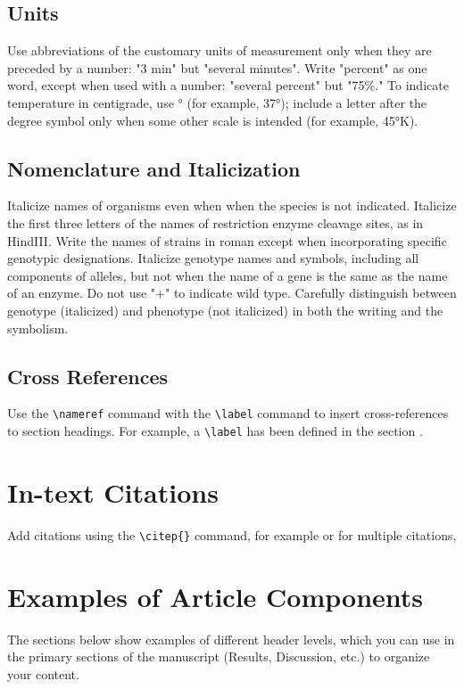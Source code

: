 \documentclass[9pt,twocolumn,twoside]{gsajnl}
\begin{document}
\subsection{Units} Use abbreviations of the customary units of measurement only when they are preceded by a number: "3 min" but "several minutes". Write "percent" as one word, except when used with a number: "several percent" but "75\%." To indicate temperature in centigrade, use ° (for example, 37°); include a letter after the degree symbol only when some other scale is intended (for example, 45°K).

\subsection{Nomenclature and Italicization} Italicize names of organisms even when  when the species is not indicated.  Italicize the first three letters of the names of restriction enzyme cleavage sites, as in HindIII. Write the names of strains in roman except when incorporating specific genotypic designations. Italicize genotype names and symbols, including all components of alleles, but not when the name of a gene is the same as the name of an enzyme. Do not use "+" to indicate wild type. Carefully distinguish between genotype (italicized) and phenotype (not italicized) in both the writing and the symbolism.

\subsection{Cross References}
Use the \verb|\nameref| command with the \verb|\label| command to insert cross-references to section headings. For example, a \verb|\label| has been defined in the section .

\section{In-text Citations}

Add citations using the \verb|\citep{}| command, for example \citep{neher2013genealogies} or for multiple citations, \citep{neher2013genealogies, rodelsperger2014characterization}

\section{Examples of Article Components}
\label{sec:examples}

The sections below show examples of different header levels, which you can use in the primary sections of the manuscript (Results, Discussion, etc.) to organize your content.
\end{document}
